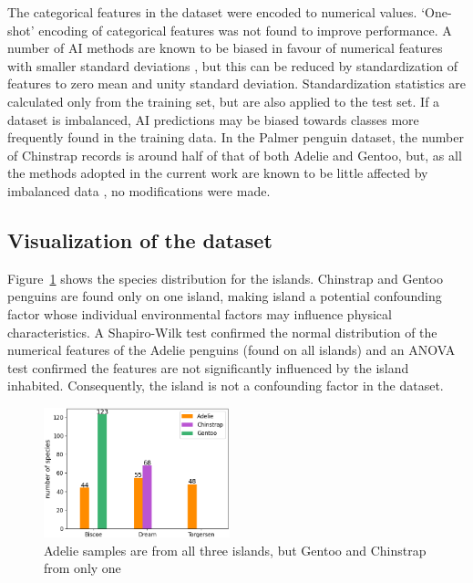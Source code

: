 \documentclass[12pt]{article}
\begin{document}
The categorical features in the dataset were encoded to numerical values. `One-shot' encoding of 
categorical features was not found to 
improve performance. A number of AI methods are known to be biased in favour of numerical features 
with smaller standard deviations \cite{hastie2009elements}, but this can be reduced by standardization 
of features to zero mean and unity standard deviation. 
Standardization statistics are calculated only from the training set, but are also applied to the test set. 
If a dataset is imbalanced, 
AI predictions may be biased towards classes more frequently found in the training data. 
In the Palmer penguin dataset, the number of Chinstrap records is around half of that of both Adelie and Gentoo, 
but, as all the methods adopted in the current work are known to be little affected by 
imbalanced data \cite{he2009learning}, no modifications were made.

\subsection*{Visualization of the dataset}

Figure~\ref{fig:islands} shows the species distribution for the islands. 
Chinstrap and Gentoo penguins are found only on one island, making island a potential confounding factor whose 
individual environmental factors may influence physical characteristics. 
A Shapiro-Wilk test confirmed the normal distribution of the numerical features of the Adelie penguins (found on 
all islands) and an ANOVA test confirmed the features are not significantly influenced by the island inhabited. 
Consequently, the island is not a confounding factor in the dataset.

\begin{figure} %
  \centering
  \vspace{-1.5\baselineskip} %
  \includegraphics[width=0.48\textwidth]{islands.png} %
  \vspace{-0.5\baselineskip} %
  \caption{Adelie samples are from all three islands, but Gentoo and Chinstrap from only one}
  \vspace{-1.5\baselineskip} %
  \label{fig:islands}
\end{figure}
\end{document}
